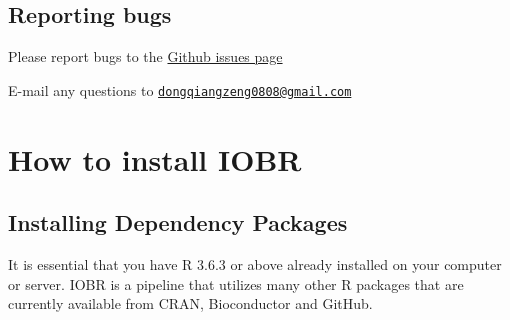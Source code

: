 \documentclass[
  12pt,
]{book}
\theoremstyle{definition}
\theoremstyle{definition}
\theoremstyle{definition}
\theoremstyle{definition}
\theoremstyle{remark}
\begin{document}
\hypertarget{reporting-bugs}{%
\section{Reporting bugs}\label{reporting-bugs}}

Please report bugs to the \href{https://github.com/IOBR/IOBR/issues}{Github issues page}

E-mail any questions to \href{mailto:dongqiangzeng0808@gmail.com}{\nolinkurl{dongqiangzeng0808@gmail.com}}

\hypertarget{how-to-install-iobr}{%
\chapter{\texorpdfstring{\textbf{How to install IOBR}}{How to install IOBR}}\label{how-to-install-iobr}}

\hypertarget{installing-dependency-packages}{%
\section{Installing Dependency Packages}\label{installing-dependency-packages}}

It is essential that you have R 3.6.3 or above already installed on your computer or server. IOBR is a pipeline that utilizes many other R packages that are currently available from CRAN, Bioconductor and GitHub.
\end{document}
